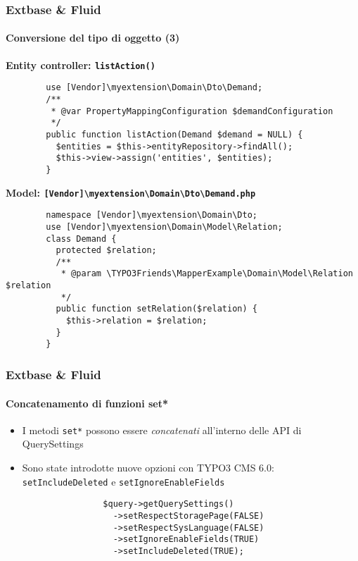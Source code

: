\begin{frame}[fragile]
	\frametitle{Extbase \& Fluid}
	\framesubtitle{Conversione del tipo di oggetto (3)}

	\lstset{
		basicstyle=\tiny\ttfamily
	}

	\smaller\textbf{Entity controller: \texttt{listAction()}}\normalsize
	\begin{lstlisting}
		use [Vendor]\myextension\Domain\Dto\Demand;
		/**
		 * @var PropertyMappingConfiguration $demandConfiguration
		 */
		public function listAction(Demand $demand = NULL) {
		  $entities = $this->entityRepository->findAll();
		  $this->view->assign('entities', $entities);
		}
	\end{lstlisting}

	\smaller\textbf{Model: \texttt{[Vendor]\textbackslash myextension\textbackslash Domain\textbackslash Dto\textbackslash Demand.php}}\normalsize
	\begin{lstlisting}
		namespace [Vendor]\myextension\Domain\Dto;
		use [Vendor]\myextension\Domain\Model\Relation;
		class Demand {
		  protected $relation;
		  /**
		   * @param \TYPO3Friends\MapperExample\Domain\Model\Relation $relation
		   */
		  public function setRelation($relation) {
		    $this->relation = $relation;
		  }
		}
	\end{lstlisting}

\end{frame}


\begin{frame}[fragile]
	\frametitle{Extbase \& Fluid}
	\framesubtitle{Concatenamento di funzioni set*}

	\lstset{
		basicstyle=\tiny\ttfamily
	}

	\begin{itemize}
		\item I metodi \texttt{set*} possono essere \emph{concatenati} all'interno delle API di QuerySettings
		\item Sono state introdotte nuove opzioni con TYPO3 CMS 6.0:\newline
			\texttt{setIncludeDeleted} e \texttt{setIgnoreEnableFields}

			\begin{lstlisting}
				$query->getQuerySettings()
				  ->setRespectStoragePage(FALSE)
				  ->setRespectSysLanguage(FALSE)
				  ->setIgnoreEnableFields(TRUE)
				  ->setIncludeDeleted(TRUE);
			\end{lstlisting}
	\end{itemize}

\end{frame}

